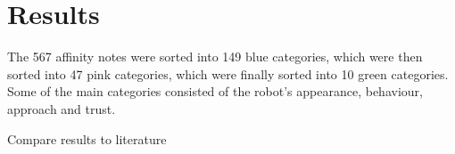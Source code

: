 \section{Results}
\label{Results}

The 567 affinity notes were sorted into 149 blue categories, which were then sorted into 47 pink categories, which were finally sorted into 10 green categories. Some of the main categories consisted of the robot’s appearance, behaviour, approach and trust.

Compare results to literature
